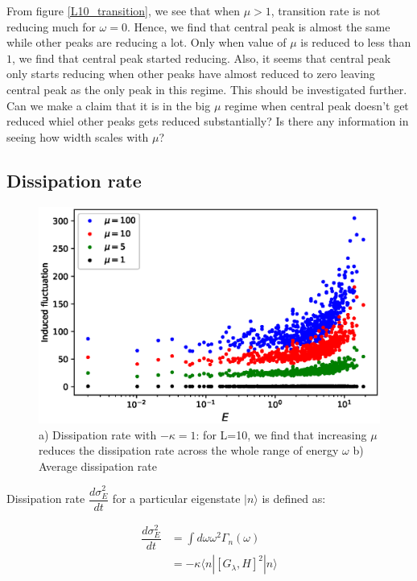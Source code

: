 \documentclass[11pt,a4paper]{article}
\begin{document}
From figure \ref{L10_transition}, we see that when $\mu > 1$, transition rate is not reducing much for $\omega=0$. Hence, we find that central peak is almost the same while other peaks are reducing a lot. Only when value of $\mu$ is reduced to less than $1$, we find that central peak started reducing. Also, it seems that central peak only starts reducing when other peaks have almost reduced to zero leaving central peak as the only peak in this regime. This should be investigated further.
Can we make a claim that it is in the big $\mu$ regime when central peak  doesn't get reduced whiel other peaks gets reduced substantially? Is there any information in seeing how width scales with $\mu$?



 \subsection{Dissipation rate }
 
 \begin{figure}[!ht]
\begin{center}
\includegraphics[scale=0.72]{new_pics/dissipation_rate.eps}
\caption{a) Dissipation rate with $-\kappa=1$: for L=10, we find that increasing $\mu$ reduces the dissipation rate across the whole range of energy $\omega$ b) Average dissipation rate  }
\label{L10_dissipation}
\end{center}
\end{figure}

Dissipation rate $\dfrac{d \sigma^2_E}{dt}$ for a particular eigenstate $ |n \rangle$ is defined as: 

\begin{align}
 \dfrac{d \sigma^2_E}{dt}&= \int d\omega \omega^2 \Gamma_n (\omega)\\
 &=-\kappa \langle n|[G_{\lambda}, H]^2 |n \rangle
\end{align}
\end{document}
